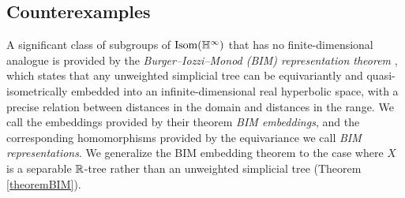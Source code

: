 

\subsection{Counterexamples}



A significant class of subgroups of $\Isom(\H^\infty)$ that has no finite-dimensional analogue is provided by the \emph{Burger--Iozzi--Monod (BIM) representation theorem} \cite[Theorem 1.1]{BIM}, which states that any unweighted simplicial tree can be equivariantly and quasi-isometrically embedded into an infinite-dimensional real hyperbolic space, with a precise relation between distances in the domain and distances in the range. We call the embeddings provided by their theorem \emph{BIM embeddings}, and the corresponding homomorphisms provided by the equivariance we call \emph{BIM representations}. We generalize the BIM embedding theorem to the case where $X$ is a separable $\R$-tree rather than an unweighted simplicial tree (Theorem \ref{theoremBIM}).

